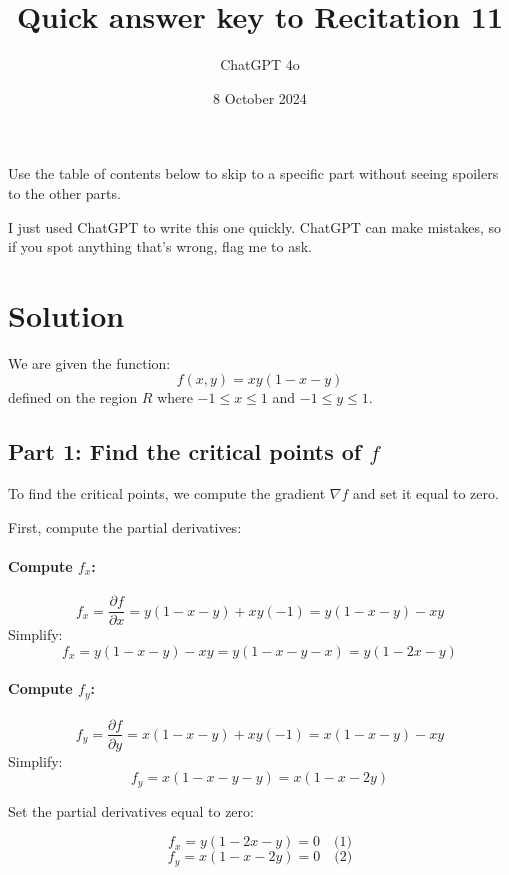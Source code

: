 \documentclass[11pt]{article}
\begin{document}
\title{Quick answer key to Recitation 11}
\author{ChatGPT 4o}
\date{8 October 2024}
\maketitle

Use the table of contents below to skip to a specific part
without seeing spoilers to the other parts.

I just used ChatGPT to write this one quickly.
ChatGPT can make mistakes, so if you spot anything that's wrong, flag me to ask.

\tableofcontents

\newpage

\section{Solution}

We are given the function:
\[
f(x, y) = xy(1 - x - y)
\]
defined on the region \( R \) where \( -1 \leq x \leq 1 \) and \( -1 \leq y \leq 1 \).

\subsection{Part 1: Find the critical points of \( f \)}

To find the critical points, we compute the gradient \( \nabla f \) and set it equal to zero.

First, compute the partial derivatives:

\paragraph{Compute \( f_x \):}

\[
f_x = \frac{\partial f}{\partial x} = y(1 - x - y) + xy(-1) = y(1 - x - y) - xy
\]
Simplify:
\[
f_x = y(1 - x - y) - x y = y(1 - x - y - x) = y(1 - 2x - y)
\]

\paragraph{Compute \( f_y \):}

\[
f_y = \frac{\partial f}{\partial y} = x(1 - x - y) + xy(-1) = x(1 - x - y) - x y
\]
Simplify:
\[
f_y = x(1 - x - y - y) = x(1 - x - 2y)
\]

Set the partial derivatives equal to zero:

\[
f_x = y(1 - 2x - y) = 0 \quad \text{(1)}
\]
\[
f_y = x(1 - x - 2y) = 0 \quad \text{(2)}
\]
\end{document}
